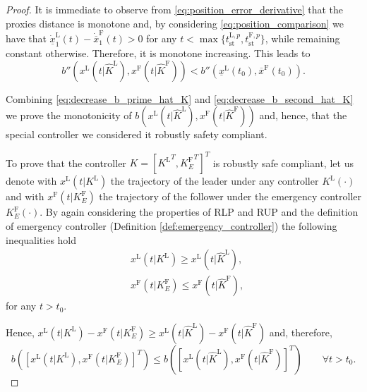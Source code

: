 \documentclass[letterpaper, 10 pt, conference]{ieeeconf}
\newcounter{Definition}
\theoremstyle{definition}
\theoremstyle{nopoint}
\begin{document}
\begin{proof}
	
	
	It is immediate to observe from \eqref{eq:position_error_derivative} that the proxies distance is monotone and, by considering \eqref{eq:position_comparison} we have that $\dot{\underline{x}}_1^\mathrm{L}(t)-\dot{\overline{x}}_1^\mathrm{F}(t)>0$ for any $t< \max\{t_{\mathrm{st}}^{\mathrm{L},p},t_{\mathrm{st}}^{\mathrm{F},p} \}$, while remaining constant otherwise. Therefore, it is monotone increasing. This leads  to 
	\begin{equation}\label{eq:decrease_b_second_hat_K}
		b''(x^\mathrm{L}(t | \hat{K}^\mathrm{L}),x^\mathrm{F}(t | \hat{K}^\mathrm{F}))< b''(\underline{x}^\mathrm{L}(t_0),\overline{x}^\mathrm{F}(t_0)). 
	\end{equation}
	
	Combining \eqref{eq:decrease_b_prime_hat_K} and \eqref{eq:decrease_b_second_hat_K} we prove the  monotonicity of $b(x^\mathrm{L}(t | \hat{K}^\mathrm{L}),x^\mathrm{F}(t | \hat{K}^\mathrm{F}))$ and, hence, that the special controller we considered it robustly safety compliant. 
	
	To prove that the controller $K=[{K^\mathrm{L}}^T, {K^\mathrm{F}_E}^T]^T$ is robustly safe compliant, let us denote with
	$x^\mathrm{L}(t | K^\mathrm{L})$ the trajectory of the leader under any controller $K^\mathrm{L}(\cdot)$ and with $x^\mathrm{F}(t | K_E^\mathrm{F})$ the trajectory of the follower under the emergency controller $K_E^\mathrm{F}(\cdot)$.  
	By again considering the properties of RLP and RUP and 
	the definition of emergency controller (Definition \ref{def:emergency_controller}) the following inequalities hold
	\begin{eqnarray}
		&x^\mathrm{L}(t | K^\mathrm{L})\geq x^\mathrm{L}(t | \hat{K}^\mathrm{L}), \label{eq:inequality2_leader}\\
		& x^\mathrm{F}(t | K_E^\mathrm{F})\leq x^\mathrm{F}(t | \hat{K}^\mathrm{F}),\label{eq:inequality2_follower}
	\end{eqnarray}
	for any $t>t_0$.
	
	Hence, $x^\mathrm{L}(t | K^\mathrm{L})-x^\mathrm{F}(t | K_E^\mathrm{F}) \geq x^\mathrm{L}(t | \hat{K}^\mathrm{L})-x^\mathrm{F}(t | \hat{K}^\mathrm{F})$ and, therefore, 
	\begin{equation*}
		b([x^\mathrm{L}(t | K^\mathrm{L}),x^\mathrm{F}(t |K_E^\mathrm{F})]^T)\leq  b([x^\mathrm{L}(t | \hat{K}^\mathrm{L}),x^\mathrm{F}(t |\hat{K}^\mathrm{F})]^T) \qquad \forall t>t_0. 
	\end{equation*}
	
	
\end{proof}
\end{document}
